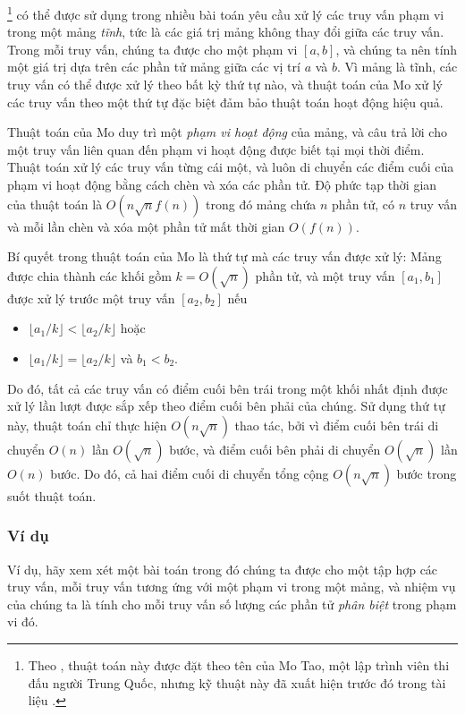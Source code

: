 
\footnote{Theo \cite{cod15}, thuật toán này
được đặt theo tên của Mo Tao, một lập trình viên thi đấu người Trung Quốc, nhưng
kỹ thuật này đã xuất hiện trước đó trong tài liệu \cite{ken06}.}
có thể được sử dụng trong nhiều bài toán
yêu cầu xử lý các truy vấn phạm vi trong 
một mảng \emph{tĩnh}, tức là các giá trị mảng
không thay đổi giữa các truy vấn.
Trong mỗi truy vấn, chúng ta được cho một phạm vi $[a,b]$,
và chúng ta nên tính một giá trị dựa trên
các phần tử mảng giữa các vị trí $a$ và $b$.
Vì mảng là tĩnh,
các truy vấn có thể được xử lý theo bất kỳ thứ tự nào,
và thuật toán của Mo
xử lý các truy vấn theo một thứ tự đặc biệt đảm bảo
thuật toán hoạt động hiệu quả.

Thuật toán của Mo duy trì một \emph{phạm vi hoạt động}
của mảng, và câu trả lời cho một truy vấn
liên quan đến phạm vi hoạt động được biết tại mọi thời điểm.
Thuật toán xử lý các truy vấn từng cái một,
và luôn di chuyển các điểm cuối của
phạm vi hoạt động bằng cách chèn và xóa các phần tử.
Độ phức tạp thời gian của thuật toán là
$O(n \sqrt n f(n))$ trong đó mảng chứa
$n$ phần tử, có $n$ truy vấn
và mỗi lần chèn và xóa một phần tử
mất thời gian $O(f(n))$.

Bí quyết trong thuật toán của Mo là thứ tự
mà các truy vấn được xử lý:
Mảng được chia thành các khối gồm $k=O(\sqrt n)$
phần tử, và một truy vấn $[a_1,b_1]$
được xử lý trước một truy vấn $[a_2,b_2]$
nếu
\begin{itemize}
\item $\lfloor a_1/k \rfloor < \lfloor a_2/k \rfloor$ hoặc
\item $\lfloor a_1/k \rfloor = \lfloor a_2/k \rfloor$ và $b_1 < b_2$.
\end{itemize}

Do đó, tất cả các truy vấn có điểm cuối bên trái
trong một khối nhất định được xử lý lần lượt
được sắp xếp theo điểm cuối bên phải của chúng.
Sử dụng thứ tự này, thuật toán
chỉ thực hiện $O(n \sqrt n)$ thao tác,
bởi vì điểm cuối bên trái di chuyển
$O(n)$ lần $O(\sqrt n)$ bước,
và điểm cuối bên phải di chuyển
$O(\sqrt n)$ lần $O(n)$ bước. Do đó, cả hai
điểm cuối di chuyển tổng cộng $O(n \sqrt n)$ bước trong suốt thuật toán.

\subsubsection*{Ví dụ}

Ví dụ, hãy xem xét một bài toán
trong đó chúng ta được cho một tập hợp các truy vấn,
mỗi truy vấn tương ứng với một phạm vi trong một mảng,
và nhiệm vụ của chúng ta là tính cho mỗi truy vấn
số lượng các phần tử \emph{phân biệt} trong phạm vi đó.

